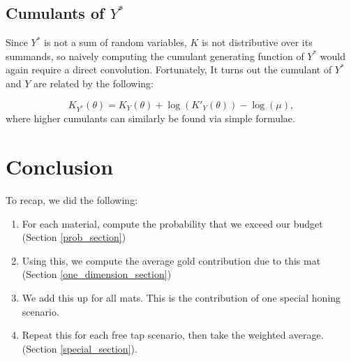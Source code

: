\documentclass[a4paper,11pt]{article}
\begin{document}
\subsection{Cumulants of $Y^*$}
Since $Y^*$ is not a sum of random variables, $K$ is not distributive over its summands, so naively computing the cumulant generating function of $Y^*$ would again require a direct convolution. Fortunately, It turns out the cumulant of $Y^*$ and $Y$ are related by the following:

$$
K_{Y^*}(\theta) = K_Y(\theta) + \log(K'_Y(\theta)) - \log(\mu),
$$
where higher cumulants can similarly be found via simple formulae. 


\newpage
\section{Conclusion}

To recap, we did the following:

\begin{enumerate}
    \item For each material, compute the probability that we exceed our budget (Section \ref{prob_section})
    \item Using this, we compute the average gold contribution due to this mat (Section \ref{one_dimension_section})
    \item We add this up for all mats. This is the contribution of one special honing scenario.
    \item Repeat this for each free tap scenario, then take the weighted average. (Section \ref{special_section}).
\end{enumerate}


\newpage

\end{document}
